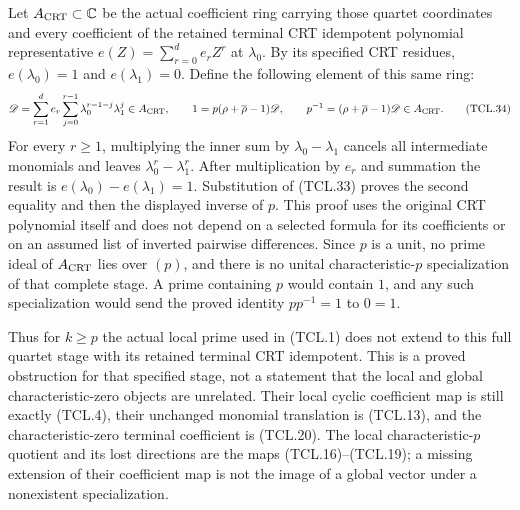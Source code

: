 Let \(A_{\rm CRT}\subset\mathbb C\) be the actual coefficient
ring carrying those quartet coordinates and every coefficient of
the retained terminal CRT idempotent polynomial representative
\(e(Z)=\sum_{r=0}^{d}e_rZ^r\) at \(\lambda_0\).
By its specified CRT residues, \(e(\lambda_0)=1\) and
\(e(\lambda_1)=0\). Define the following element of this same ring:
\[
 \mathscr D=\sum_{r=1}^{d}e_r
       \sum_{j=0}^{r-1}\lambda_0^{r-1-j}\lambda_1^j
       \in A_{\rm CRT},\qquad
 1=p(\rho+\overline\rho-1)\mathscr D,
 \qquad
 p^{-1}=(\rho+\overline\rho-1)\mathscr D\in A_{\rm CRT}.
 \tag{TCL.34}\label{CFStage:eq:tcl-crt-obstruction}
\]
For every \(r\geq1\), multiplying the inner sum by
\(\lambda_0-\lambda_1\) cancels all intermediate monomials
and leaves \(\lambda_0^r-\lambda_1^r\). After multiplication
by \(e_r\) and summation the result is
\(e(\lambda_0)-e(\lambda_1)=1\). Substitution of (TCL.33)
proves the second equality and then the displayed inverse of
\(p\). This proof uses the original CRT polynomial itself and
does not depend on a selected formula for its coefficients or
on an assumed list of inverted pairwise differences.
Since \(p\) is a unit, no prime ideal of \(A_{\rm CRT}\)
lies over \((p)\), and there is no unital characteristic-\(p\)
specialization of that complete stage. A prime containing \(p\)
would contain \(1\), and any such specialization would send the
proved identity \(p p^{-1}=1\) to \(0=1\).

Thus for \(k\geq p\) the actual local prime used in (TCL.1)
does not extend to this full quartet stage with its retained
terminal CRT idempotent. This is a proved obstruction for that
specified stage, not a statement that the local and global
characteristic-zero objects are unrelated. Their local cyclic
coefficient map is still exactly (TCL.4), their unchanged monomial
translation is (TCL.13), and the characteristic-zero terminal
coefficient is (TCL.20). The local characteristic-\(p\) quotient
and its lost directions are the maps (TCL.16)--(TCL.19); a missing
extension of their coefficient map is not the image of a global
vector under a nonexistent specialization.

